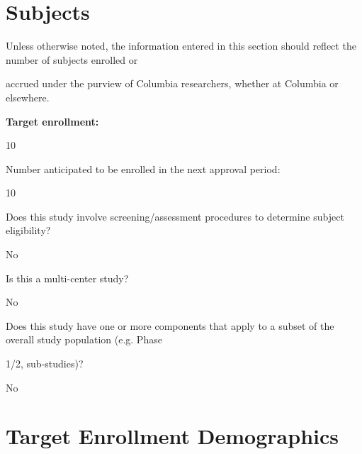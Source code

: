 \documentclass[10pt, letterpaper]{article}
\begin{document}
\vspace{0.5em}

\vspace{0.5em}

\vspace{0.5em}

\section*{Subjects}

\vspace{0.5em}

Unless otherwise noted, the information entered in this section should reflect the number of subjects enrolled or

accrued under the purview of Columbia researchers, whether at Columbia or elsewhere.

\noindent \textbf{Target enrollment:}

10

Number anticipated to be enrolled in the next approval period:

10

Does this study involve screening/assessment procedures to determine subject eligibility?

No

Is this a multi-center study?

No

Does this study have one or more components that apply to a subset of the overall study population (e.g. Phase

1/2, sub-studies)?

No

\vspace{0.5em}

\vspace{0.5em}

\section*{Target Enrollment Demographics}
\end{document}
